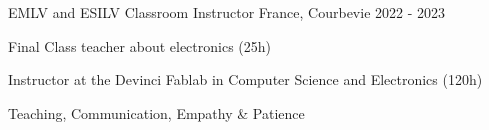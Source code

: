 \begin{cventries}
	\cventry
	{EMLV and ESILV} %
	{Classroom Instructor} %
	{France, Courbevie} %
	{2022 - 2023} %
	{
		\begin{cvitems} %
			\item {Final Class teacher about electronics (25h)}
			\item {Instructor at the Devinci Fablab in Computer Science and Electronics (120h)}
		\end{cvitems}
	}
	{
		\begin{cvitemsskills} %
			\item {Teaching, Communication, Empathy \& Patience}
		\end{cvitemsskills}
	}

\end{cventries}

